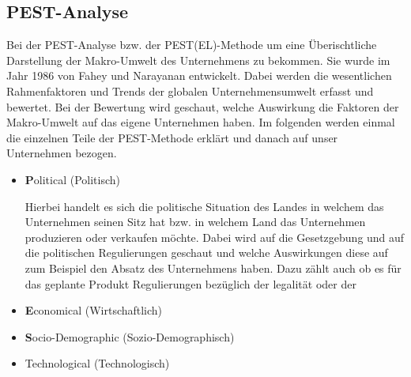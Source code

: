 \subsection{PEST-Analyse} \label{pest}
    Bei der PEST-Analyse bzw. der PEST(EL)-Methode um eine Überischtliche Darstellung der Makro-Umwelt des Unternehmens
    zu bekommen. Sie wurde im Jahr 1986 von Fahey und Narayanan entwickelt. Dabei werden die wesentlichen Rahmenfaktoren
    und Trends der globalen Unternehmensumwelt erfasst und 
    bewertet. Bei der Bewertung wird geschaut, welche Auswirkung die Faktoren der Makro-Umwelt auf das eigene 
    Unternehmen haben. Im folgenden werden einmal die einzelnen Teile der PEST-Methode erklärt und danach auf unser 
    Unternehmen bezogen.

        \begin{itemize}
            \item \textbf Political (Politisch)

                Hierbei handelt es sich die politische Situation des Landes in welchem das Unternehmen seinen Sitz hat 
                bzw. in welchem Land das Unternehmen produzieren oder verkaufen möchte. Dabei wird auf die Gesetzgebung 
                und auf die politischen Regulierungen geschaut und welche Auswirkungen diese auf zum Beispiel den Absatz
                des Unternehmens haben. Dazu zählt auch ob es für das geplante Produkt Regulierungen bezüglich der 
                legalität oder der 

            \item \textbf Economical (Wirtschaftlich)
            \item \textbf Socio-Demographic (Sozio-Demographisch)
            \item Technological (Technologisch)
        \end{itemize}
